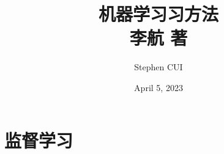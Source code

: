 \documentclass[openany]{book}
\title{\textbf{机器学习习方法}\\李航 著}
\author{Stephen CUI\orcidlink{0009-0008-2664-5882}}
\date{April 5, 2023}
\begin{document}
\maketitle
\tableofcontents
\part{监督学习}

\end{document}
